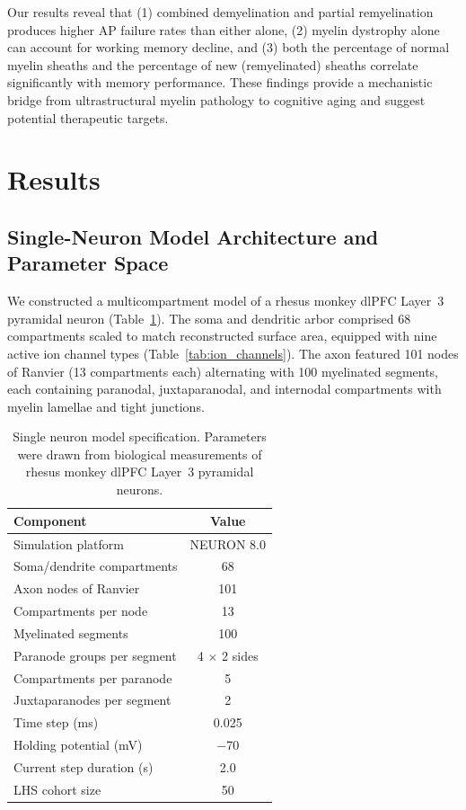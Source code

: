 \documentclass[11pt]{article}
\begin{document}
Our results reveal that (1) combined demyelination and partial remyelination produces higher AP failure rates than either alone, (2) myelin dystrophy alone can account for working memory decline, and (3) both the percentage of normal myelin sheaths and the percentage of new (remyelinated) sheaths correlate significantly with memory performance. These findings provide a mechanistic bridge from ultrastructural myelin pathology to cognitive aging and suggest potential therapeutic targets.

\section{Results}

\subsection{Single-Neuron Model Architecture and Parameter Space}

We constructed a multicompartment model of a rhesus monkey dlPFC Layer~3 pyramidal neuron (Table~\ref{tab:model_spec}). The soma and dendritic arbor comprised 68 compartments scaled to match reconstructed surface area, equipped with nine active ion channel types (Table~\ref{tab:ion_channels}). The axon featured 101 nodes of Ranvier (13 compartments each) alternating with 100 myelinated segments, each containing paranodal, juxtaparanodal, and internodal compartments with myelin lamellae and tight junctions.

\begin{table}[H]
\centering
\caption{Single neuron model specification. Parameters were drawn from biological measurements of rhesus monkey dlPFC Layer~3 pyramidal neurons.}
\label{tab:model_spec}
\begin{tabular}{lc}
\toprule
\textbf{Component} & \textbf{Value} \\
\midrule
Simulation platform & NEURON 8.0 \\
Soma/dendrite compartments & 68 \\
Axon nodes of Ranvier & 101 \\
Compartments per node & 13 \\
Myelinated segments & 100 \\
Paranode groups per segment & 4 $\times$ 2 sides \\
Compartments per paranode & 5 \\
Juxtaparanodes per segment & 2 \\
Time step (ms) & 0.025 \\
Holding potential (mV) & $-$70 \\
Current step duration (s) & 2.0 \\
LHS cohort size & 50 \\
\bottomrule
\end{tabular}
\end{table}
\end{document}
